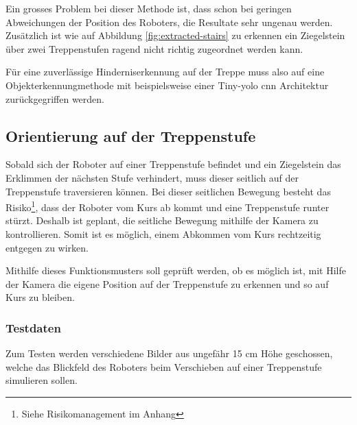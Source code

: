 Ein grosses Problem bei dieser Methode ist, dass schon bei geringen Abweichungen der Position
des Roboters, die Resultate sehr ungenau werden. 
Zusätzlich ist wie auf Abbildung \ref{fig:extracted-stairs} zu erkennen ein Ziegelstein über zwei Treppenstufen ragend nicht richtig zugeordnet werden kann.

Für eine zuverlässige Hinderniserkennung auf der Treppe muss also auf eine Objekterkennungmethode mit beispielsweise einer 
Tiny-\acrshort{yolo} \cite{YOLOv3} \acrfull{cnn} Architektur zurückgegriffen werden.

\subsection{Orientierung auf der Treppenstufe}
\label{sec:orientierung-auf-treppenstufe-funktionsmuster}
Sobald sich der Roboter auf einer Treppenstufe befindet und ein Ziegelstein das Erklimmen der nächsten Stufe verhindert, muss dieser seitlich auf der Treppenstufe traversieren können. Bei dieser seitlichen Bewegung besteht das Risiko\footnote{Siehe Risikomanagement im Anhang}, dass der Roboter vom Kurs ab kommt und eine Treppenstufe runter stürzt.
Deshalb ist geplant, die seitliche Bewegung mithilfe der Kamera zu kontrollieren. Somit ist es möglich, einem Abkommen vom Kurs rechtzeitig entgegen zu wirken.

Mithilfe dieses Funktionsmusters soll geprüft werden, ob es möglich ist, mit Hilfe der Kamera die eigene Position auf der Treppenstufe zu erkennen und so auf Kurs zu bleiben. 

\subsubsection{Testdaten}
Zum Testen werden verschiedene Bilder aus ungefähr 15 cm Höhe geschossen, welche das Blickfeld des Roboters beim Verschieben auf einer Treppenstufe simulieren sollen.


